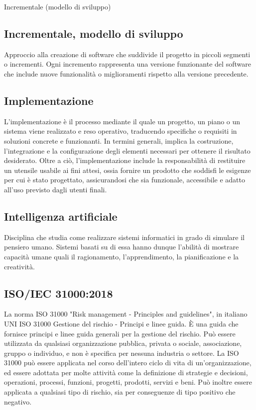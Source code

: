 \hypertarget{sec:modello_incrementale}{Incrementale (modello di sviluppo)}
\subsection*{Incrementale, modello di sviluppo}
Approccio alla creazione di software che suddivide il progetto in piccoli segmenti o incrementi. 
Ogni incremento rappresenta una versione funzionante del software che include nuove funzionalità o miglioramenti rispetto alla versione precedente.

\hypertarget{sec:implementazione}{}
\subsection*{Implementazione}
L'implementazione è il processo mediante il quale un progetto, un piano o un sistema viene realizzato e reso operativo, traducendo 
specifiche o requisiti in soluzioni concrete e funzionanti. In termini generali, implica la costruzione, l'integrazione e la 
configurazione degli elementi necessari per ottenere il risultato desiderato. Oltre a ciò, l'implementazione include la responsabilità 
di restituire un utensile usabile ai fini attesi, ossia fornire un prodotto che soddisfi le esigenze per cui è stato progettato, 
assicurandosi che sia funzionale, accessibile e adatto all'uso previsto dagli utenti finali.

\hypertarget{sec:intelligenza_artificiale}{}
\subsection*{Intelligenza artificiale}
Disciplina che studia come realizzare sistemi informatici in grado di simulare il pensiero umano. Sistemi basati su di essa hanno dunque l'abilità di mostrare 
capacità umane quali il ragionamento, l'apprendimento, la pianificazione e la creatività.

\hypertarget{ISO/IEC 31000:2018}{}
\subsection*{ISO/IEC 31000:2018}
La norma ISO 31000 "Risk management - Principles and guidelines", 
in italiano UNI ISO 31000 Gestione del rischio - Principi e linee guida. 
È una guida che fornisce principi e linee guida generali per la gestione del rischio. 
Può essere utilizzata da qualsiasi organizzazione pubblica, privata o sociale, associazione, gruppo o individuo, e non è specifica per nessuna industria o settore.
La ISO 31000 può essere applicata nel corso dell'intero ciclo di vita di un'organizzazione, ed essere adottata per molte attività come la definizione di strategie e decisioni, operazioni, processi, funzioni, progetti, prodotti, servizi e beni.
Può inoltre essere applicata a qualsiasi tipo di rischio, sia per conseguenze di tipo positivo che negativo. 

